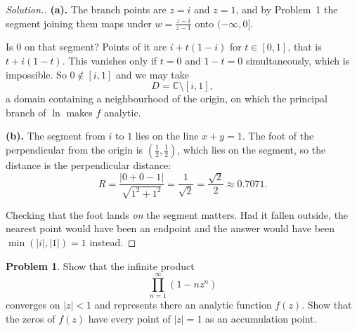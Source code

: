 \documentclass[11pt,a4paper]{article}
\theoremstyle{definition}
\newtheorem{problemx}{Problem}[section]
\newenvironment{problem}{\begin{problemx}}{\end{problemx}}
\newenvironment{solution}
  {\renewcommand{\qedsymbol}{}\begin{proof}[\textit{Solution}.]}
  {\end{proof}}
\begin{document}
\begin{solution}
\textbf{(a).} The branch points are $z = i$ and $z = 1$, and by Problem~1 the
segment joining them maps under $w = \frac{z-i}{z-1}$ onto $(-\infty,0]$.

Is $0$ on that segment? Points of it are $i + t(1-i)$ for $t \in [0,1]$, that is
$t + i(1-t)$. This vanishes only if $t = 0$ and $1 - t = 0$ simultaneously, which
is impossible. So $0 \notin [i,1]$ and we may take
$$D = \mathbb{C} \setminus [i,1],$$
a domain containing a neighbourhood of the origin, on which the principal branch
of $\ln$ makes $f$ analytic.

\textbf{(b).} The segment from $i$ to $1$ lies on the line $x + y = 1$. The foot
of the perpendicular from the origin is $\left(\tfrac12,\tfrac12\right)$, which
lies on the segment, so the distance is the perpendicular distance:
$$R = \frac{\left|0 + 0 - 1\right|}{\sqrt{1^2+1^2}}
= \frac{1}{\sqrt{2}} = \frac{\sqrt{2}}{2} \approx 0.7071 .$$

Checking that the foot lands \emph{on} the segment matters. Had it fallen outside,
the nearest point would have been an endpoint and the answer would have been
$\min(\left|i\right|, \left|1\right|) = 1$ instead.
\end{solution}


\begin{problem}
Show that the infinite product
$$\prod^{\infty}_{n = 1}\left(1 - n z^{n}\right)$$
converges on $\left|z\right| < 1$ and represents there an analytic function
$f(z)$. Show that the zeros of $f(z)$ have every point of
$\left|z\right| = 1$ as an accumulation point.
\end{problem}
\end{document}
